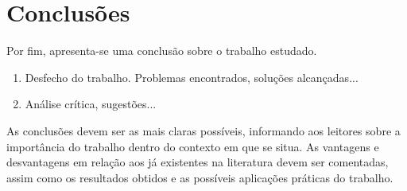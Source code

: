 \section{Conclusões} 

Por fim, apresenta-se uma conclusão sobre o trabalho estudado.
\begin{enumerate}								
	\item  Desfecho do trabalho. Problemas encontrados, soluções alcançadas...
	\item  Análise crítica, sugestões...	
\end{enumerate}


As conclusões devem ser as mais claras possíveis, informando aos leitores sobre a importância do trabalho dentro do contexto em que se situa. As vantagens e desvantagens em relação aos já existentes na literatura devem ser comentadas, assim como os resultados obtidos e as possíveis aplicações práticas do trabalho.





\balance


